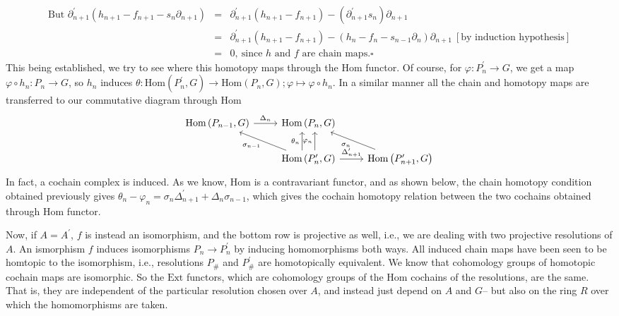 \documentclass[a4paper,11pt, tikz]{article}
\newcommand{\lb}{\left(}
\newcommand{\rb}{\right)}
\newcommand{\ls}{\left[}
\newcommand{\rs}{\right]}
\newcommand{\dash}{^\prime}
\newcommand{\D}{\Delta}
\newcommand{\f}{\varphi}
\newcommand{\s}{\sigma}
\renewcommand{\th}{\theta}
\newcommand{\dl}{\partial}
\newcommand{\Hom}{\text{Hom}}
\newcommand{\Ext}{\text{Ext}}
\newcommand{\tends}{\rightarrow}
\begin{document}
\begin{eqnarray*}
 \text{But } \dl_{n+1}\dash\lb h_{n+1}-f_{n+1}-s_n\dl_{n+1}\rb &=& \dl_{n+1}\dash\lb h_{n+1}-f_{n+1}\rb-\lb \dl_{n+1}\dash s_n\rb\dl_{n+1}\\
  &=& \dl_{n+1}\dash\lb h_{n+1}-f_{n+1}\rb-\lb h_n-f_n-s_{n-1}\dl_n\rb\dl_{n+1}~\ls\text{by induction hypothesis}\rs\\
  &=& 0,~\text{since $h$ and $f$ are chain maps}.\square 
\end{eqnarray*}
This being established, we try to see where this homotopy maps through the $\Hom$ functor. Of course, for $\f:P_n\dash\tends G$, we get a map $\f\circ h_n:P_n\tends G$, so $h_n$ induces $\th: \Hom\lb P_n\dash, G\rb\tends \Hom\lb P_n, G\rb; \f\mapsto \f\circ h_n$. In a similar manner all the chain and homotopy maps are transferred to our commutative diagram through $\Hom$
\begin{equation*}
\begin{tikzcd}
{\Hom\lb P_{n-1}, G\rb}\ar[r, "\D_n"] &{ \Hom\lb P_n, G\rb }& \\
& {\Hom\lb P_n\dash, G\rb }\ar[ul, "\s_{n-1}"] \ar[u, "\th_n", shift left=1.5ex] \ar[u, "\f_n", shift right=1.5ex] \ar[r, "\D_{n+1}\dash"] &{ \Hom\lb P_{n+1}\dash, G\rb} \ar[ul, "\s_n"]
\end{tikzcd}
\end{equation*}
In fact, a cochain complex is induced. As we know, $\Hom$ is a contravariant functor, and as shown below, the chain homotopy condition obtained previously gives $\th_n-\f_n=\s_n\D_{n+1}\dash+\D_n\s_{n-1}$, which gives the cochain homotopy relation between the two cochains obtained through $\Hom$ functor.

Now, if $A=A\dash$, $f$ is instead an isomorphism, and the bottom row is projective as well, i.e., we are dealing with two projective resolutions of $A$. An ismorphism $f$ induces isomorphisms $P_n\tends P_n\dash$ by inducing homomorphisms both ways. All induced chain maps have been seen to be homtopic to the isomorphism, i.e., resolutions $P_\#$ and $P_\#\dash$ are homotopically equivalent. We know that cohomology groups of homotopic cochain maps are isomorphic. So the $\Ext$ functors, which are cohomology groups of the $\Hom$ cochains of the resolutions, are the same. That is, they are independent of the particular resolution chosen over $A$, and instead just depend on $A$ and $G$-- but also on the ring $R$ over which the homomorphisms are taken.
\end{document}
